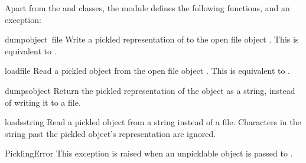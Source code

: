 Apart from the  and  classes, the
module defines the following functions, and an exception:

\begin{funcdesc}{dump}{object\, file}
Write a pickled representation of  to the open file object
.  This is equivalent to .
\end{funcdesc}

\begin{funcdesc}{load}{file}
Read a pickled object from the open file object .  This is
equivalent to .
\end{funcdesc}

\begin{funcdesc}{dumps}{object}
Return the pickled representation of the object as a string, instead
of writing it to a file.
\end{funcdesc}

\begin{funcdesc}{loads}{string}
Read a pickled object from a string instead of a file.  Characters in
the string past the pickled object's representation are ignored.
\end{funcdesc}

\begin{excdesc}{PicklingError}
This exception is raised when an unpicklable object is passed to
.
\end{excdesc}

